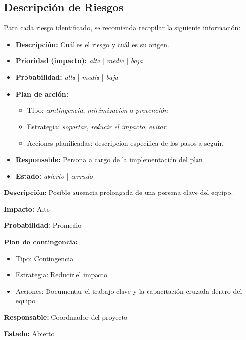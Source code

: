 \subsection{Descripción de Riesgos}\label{subsec:descripcion-de-riesgos}

Para cada riesgo identificado, se recomienda recopilar la siguiente información:

\begin{itemize}
    \item \textbf{Descripción:} Cuál es el riesgo y cuál es su origen.

    \item \textbf{Prioridad (impacto):} \textit{alta} | \textit{media} | \textit{baja}

    \item \textbf{Probabilidad:} \textit{alta} | \textit{media} | \textit{baja}

    \item \textbf{Plan de acción:}
    \begin{itemize}
        \item Tipo: \textit{contingencia}, \textit{minimización} o \textit{prevención}
        \item Estrategia: \textit{soportar}, \textit{reducir el impacto}, \textit{evitar}
        \item Acciones planificadas: descripción específica de los pasos a seguir.
    \end{itemize}
    \item \textbf{Responsable:} Persona a cargo de la implementación del plan
    \item \textbf{Estado:} \textit{abierto} | \textit{cerrado}
\end{itemize}

\begin{exemplo}
    \textbf{Descripción:} Posible ausencia prolongada de una persona clave del equipo.

    \textbf{Impacto:} Alto

    \textbf{Probabilidad:} Promedio

    \textbf{Plan de contingencia:}
    \begin{itemize}
        \item Tipo: Contingencia
        \item Estrategia: Reducir el impacto
        \item Acciones: Documentar el trabajo clave y la capacitación cruzada dentro del equipo
    \end{itemize}

    \textbf{Responsable:} Coordinador del proyecto

    \textbf{Estado:} Abierto
\end{exemplo}

